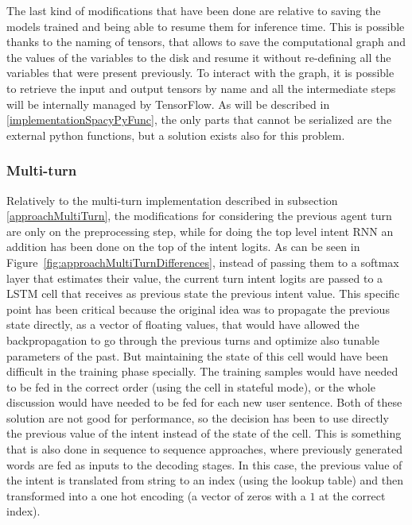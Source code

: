 The last kind of modifications that have been done are relative to saving the models trained and being able to resume them for inference time. This is possible thanks to the naming of tensors, that allows to save the computational graph and the values of the variables to the disk and resume it without re-defining all the variables that were present previously. To interact with the graph, it is possible to retrieve the input and output tensors by name and all the intermediate steps will be internally managed by TensorFlow. As will be described in \ref{implementationSpacyPyFunc}, the only parts that cannot be serialized are the external python functions, but a solution exists also for this problem.

\subsubsection{Multi-turn}
Relatively to the multi-turn implementation described in subsection \ref{approachMultiTurn}, the modifications for considering the previous agent turn are only on the preprocessing step, while for doing the top level intent RNN an addition has been done on the top of the intent logits. As can be seen in Figure~\ref{fig:approachMultiTurnDifferences}, instead of passing them to a softmax layer that estimates their value, the current turn intent logits are passed to a LSTM cell that receives as previous state the previous intent value. This specific point has been critical because the original idea was to propagate the previous state directly, as a vector of floating values, that would have allowed the backpropagation to go through the previous turns and optimize also tunable parameters of the past. But maintaining the state of this cell would have been difficult in the training phase specially. The training samples would have needed to be fed in the correct order (using the cell in stateful mode), or the whole discussion would have needed to be fed for each new user sentence. Both of these solution are not good for performance, so the decision has been to use directly the previous value of the intent instead of the state of the cell. This is something that is also done in sequence to sequence approaches, where previously generated words are fed as inputs to the decoding stages. In this case, the previous value of the intent is translated from string to an index (using the lookup table) and then transformed into a one hot encoding (a vector of zeros with a  \( 1 \) at the correct index).


